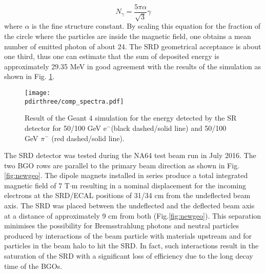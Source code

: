 \begin{equation}
N_\gamma = \frac{5 \pi \alpha}{\sqrt{3}}\gamma
\end{equation}
where $\alpha$ is the fine structure constant. 
By scaling this equation for the fraction of the circle where the particles are inside the magnetic field, one obtains a mean number of emitted photon of about 24.
The SRD geometrical acceptance is about one third,  thus one can estimate that the sum of deposited energy is approximately 29.35 MeV in good agreement with the results of the simulation as shown in Fig. \ref{fig:SRspectrum}. 
 
\begin{figure}[htb!]
\centering
\texttt{[image: \\pdirthree/comp\_spectra.pdf]}
\caption[SR spectrum for different energy detected in the SRD]{Result of the Geant 4 simulation for the energy detected by the SR detector for 50/100 GeV e$^-$(black dashed/solid line) and 50/100 GeV $\pi^-$ (red dashed/solid line).}
\label{fig:SRspectrum}
\end{figure}

The SRD detector was tested during the NA64 test beam run in July 2016. The two BGO rows are parallel to the primary beam direction as shown in Fig.\ref{fig:newgeo}. The dipole magnets installed in series produce a total integrated magnetic field of 7 T$\cdot$m \cite{Banerjee:2016tad} resulting in a nominal displacement for the incoming electrons at the SRD/ECAL positions of 31/34 cm from the undeflected beam axis. The SRD was placed between the undeflected and the deflected beam axis at a distance of approximately 9 cm from both (Fig.\ref{fig:newgeo}). This separation minimises the possibility for Bremsstrahlung photons and neutral particles produced by interactions of the beam particle with materials upstream and for particles in the beam halo to hit the SRD. In fact, such interactions result in the saturation of the SRD with a significant loss of efficiency due to the long decay time of the BGOs.


